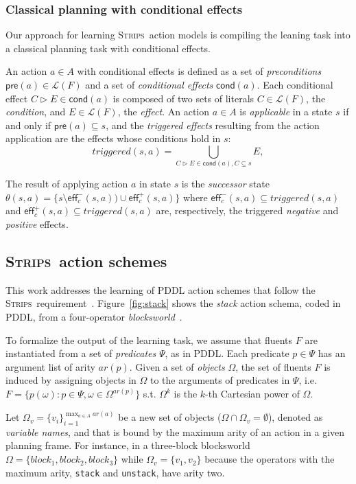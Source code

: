\documentclass{article}
\newcommand{\pre}{\mathsf{pre}}     %
\newcommand{\eff}{\mathsf{eff}}     %
\newcommand{\cond}{\mathsf{cond}}   %
\newcommand{\strips}{\textsc{Strips}}     %
\begin{document}
\subsubsection{Classical planning with conditional effects}
Our approach for learning \strips\ action models is compiling the leaning task into a classical planning task with conditional effects.

An action $a\in A$ with conditional effects is defined as a set of {\em preconditions} $\pre(a)\in\mathcal{L}(F)$ and a set of {\em conditional effects} $\cond(a)$. Each conditional effect $C\rhd E\in\cond(a)$ is composed of two sets of literals $C\in\mathcal{L}(F)$, the {\em condition}, and $E\in\mathcal{L}(F)$, the {\em effect}. An action $a\in A$ is {\em applicable} in a state $s$ if and only if $\pre(a)\subseteq s$, and the {\em triggered effects} resulting from the action application are the effects whose conditions hold in $s$:
\[
triggered(s,a)=\bigcup_{C\rhd E\in\cond(a),C\subseteq s} E,
\]

The result of applying action $a$ in state $s$ is the {\em successor} state $\theta(s,a)=\{s\setminus\eff_c^-(s,a))\cup\eff_c^+(s,a)\}$ where $\eff_c^-(s,a)\subseteq triggered(s,a)$ and $\eff_c^+(s,a)\subseteq triggered(s,a)$ are, respectively, the triggered {\em negative} and {\em positive} effects.


\subsection{\strips\ action schemes}
This work addresses the learning of PDDL action schemes that follow the \strips\ requirement~\cite{mcdermott1998pddl,fox2003pddl2}. Figure~\ref{fig:stack} shows the {\em stack} action schema, coded in PDDL, from a four-operator {\em blocksworld}~\cite{slaney2001blocks}.

To formalize the output of the learning task, we assume that fluents $F$ are instantiated from a set of {\em predicates} $\Psi$, as in PDDL. Each predicate $p\in\Psi$ has an argument list of arity $ar(p)$. Given a set of {\em objects} $\Omega$, the set of fluents $F$ is induced by assigning objects in $\Omega$ to the arguments of predicates in $\Psi$, i.e.~$F=\{p(\omega):p\in\Psi,\omega\in\Omega^{ar(p)}\}$ s.t. $\Omega^k$ is the $k$-th Cartesian power of $\Omega$.

Let $\Omega_v=\{v_i\}_{i=1}^{\operatorname*{max}_{a\in A} ar(a)}$ be a new set of objects ($\Omega\cap\Omega_v=\emptyset$), denoted as {\em variable names}, and that is bound by the maximum arity of an action in a given planning frame. For instance, in a three-block blocksworld $\Omega=\{block_1, block_2, block_3\}$ while $\Omega_v=\{v_1, v_2\}$ because the operators with the maximum arity, {\small\tt stack} and {\small\tt unstack}, have arity two.
\end{document}
